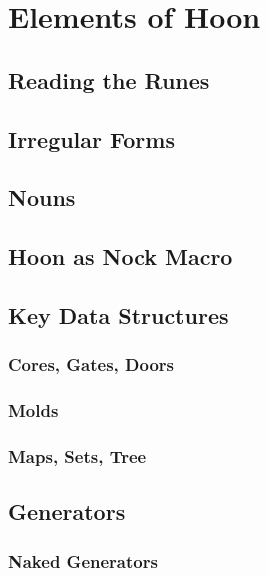 \setchapterpreamble[u]{\margintoc}
\chapter{Elements of Hoon}


\section{Reading the Runes}

\section{Irregular Forms}

\section{Nouns}

\section{Hoon as Nock Macro}

\section{Key Data Structures}

\subsection{Cores, Gates, Doors}

\subsection{Molds}

\subsection{Maps, Sets, Tree}

\section{Generators}

\subsection{Naked Generators}


